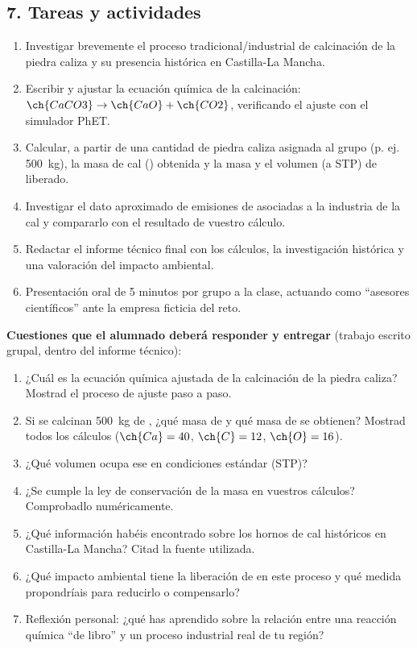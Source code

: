 \documentclass[11pt,a4paper]{article}
\begin{document}
\subsection*{7. Tareas y actividades}
\begin{enumerate}
    \item Investigar brevemente el proceso tradicional/industrial de calcinación de la piedra caliza y su presencia histórica en Castilla-La Mancha.
    \item Escribir y ajustar la ecuación química de la calcinación: $\ch{CaCO3} \rightarrow \ch{CaO} + \ch{CO2}$, verificando el ajuste con el simulador PhET.
    \item Calcular, a partir de una cantidad de piedra caliza asignada al grupo (p. ej. \qty{500}{\kg}), la masa de cal () obtenida y la masa y el volumen (a STP) de  liberado.
    \item Investigar el dato aproximado de emisiones de  asociadas a la industria de la cal y compararlo con el resultado de vuestro cálculo.
    \item Redactar el informe técnico final con los cálculos, la investigación histórica y una valoración del impacto ambiental.
    \item Presentación oral de 5 minutos por grupo a la clase, actuando como ``asesores científicos'' ante la empresa ficticia del reto.
\end{enumerate}
\textbf{Cuestiones que el alumnado deberá responder y entregar} (trabajo escrito grupal, dentro del informe técnico):
\begin{enumerate}
    \item ¿Cuál es la ecuación química ajustada de la calcinación de la piedra caliza? Mostrad el proceso de ajuste paso a paso.
    \item Si se calcinan \qty{500}{\kg} de , ¿qué masa de  y qué masa de  se obtienen? Mostrad todos los cálculos ($\ch{Ca}=40$, $\ch{C}=12$, $\ch{O}=16$).
    \item ¿Qué volumen ocupa ese  en condiciones estándar (STP)?
    \item ¿Se cumple la ley de conservación de la masa en vuestros cálculos? Comprobadlo numéricamente.
    \item ¿Qué información habéis encontrado sobre los hornos de cal históricos en Castilla-La Mancha? Citad la fuente utilizada.
    \item ¿Qué impacto ambiental tiene la liberación de  en este proceso y qué medida propondríais para reducirlo o compensarlo?
    \item Reflexión personal: ¿qué has aprendido sobre la relación entre una reacción química ``de libro'' y un proceso industrial real de tu región?
\end{enumerate}
\end{document}

